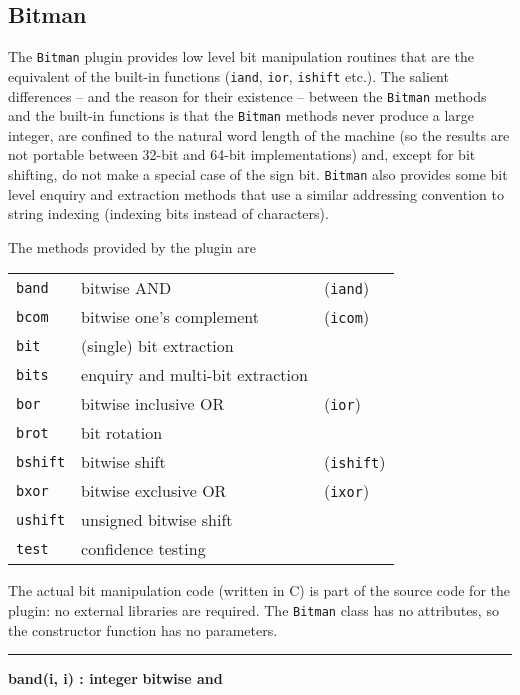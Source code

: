 \subsection{Bitman}
The \texttt{Bitman} plugin provides low level bit manipulation routines that are
the equivalent of the built-in functions (\texttt{iand}, \texttt{ior},
\texttt{ishift} etc.). The salient differences -- and the reason for their
existence -- between the \texttt{Bitman} methods and the built-in functions is
that the \texttt{Bitman} methods never produce a large integer, are confined to
the natural word length of the machine (so the results are not portable between
32-bit and 64-bit implementations) and, except for bit shifting, do not make a
special case of the sign bit.  \texttt{Bitman} also provides some bit level
enquiry and extraction methods that use a similar addressing convention to
string indexing (indexing bits instead of characters).

The methods provided by the plugin are
\begin{center}
\begin{xtabular}{|m{0.5in}|m{2.5in}|m{0.5in}|}
    \hline
    \texttt{band}   & bitwise AND              & (\texttt{iand})\\
    \texttt{bcom}   & bitwise one's complement & (\texttt{icom})\\
    \texttt{bit}    & (single) bit extraction  &\\
    \texttt{bits}   & enquiry and multi-bit extraction &\\
    \texttt{bor}    & bitwise inclusive OR     & (\texttt{ior})\\
    \texttt{brot}   & bit rotation             &\\
    \texttt{bshift} & bitwise shift            & (\texttt{ishift})\\
    \texttt{bxor}   & bitwise exclusive OR     & (\texttt{ixor})\\
    \texttt{ushift} & unsigned bitwise shift   &\\
    \texttt{test}   & confidence testing       &\\
    \hline
\end{xtabular}
\end{center}
The actual bit manipulation code (written in C) is part of the source code for
the plugin: no external libraries are required. The \texttt{Bitman} class has no
attributes, so the constructor function has no parameters.
\bigskip\hrule\vspace{0.1cm}
\noindent
{\bf band(i, i) : integer } \hfill {\bf bitwise and}

